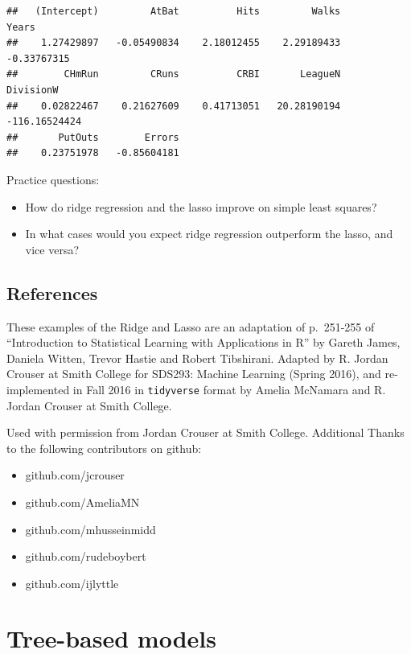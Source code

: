 \documentclass[openany]{book}
\providecommand{\tightlist}{%
  \setlength{\itemsep}{0pt}\setlength{\parskip}{0pt}}
\begin{document}
\begin{verbatim}
##   (Intercept)         AtBat          Hits         Walks         Years 
##    1.27429897   -0.05490834    2.18012455    2.29189433   -0.33767315 
##        CHmRun         CRuns          CRBI       LeagueN     DivisionW 
##    0.02822467    0.21627609    0.41713051   20.28190194 -116.16524424 
##       PutOuts        Errors 
##    0.23751978   -0.85604181
\end{verbatim}

Practice questions:

\begin{itemize}
\tightlist
\item
  How do ridge regression and the lasso improve on simple least squares?
\item
  In what cases would you expect ridge regression outperform the lasso, and vice versa?
\end{itemize}

\hypertarget{references}{%
\section{References}\label{references}}

These examples of the Ridge and Lasso are an adaptation of p.~251-255 of ``Introduction to
Statistical Learning with Applications in R'' by Gareth James, Daniela Witten, Trevor Hastie and Robert
Tibshirani. Adapted by R. Jordan Crouser at Smith College for SDS293: Machine Learning (Spring 2016), and re-implemented in Fall 2016 in \texttt{tidyverse} format by Amelia McNamara and R. Jordan Crouser at Smith College.

Used with permission from Jordan Crouser at Smith College. Additional Thanks to the following contributors on github:

\begin{itemize}
\tightlist
\item
  github.com/jcrouser
\item
  github.com/AmeliaMN
\item
  github.com/mhusseinmidd
\item
  github.com/rudeboybert
\item
  github.com/ijlyttle
\end{itemize}

\hypertarget{tree-based-models}{%
\chapter{Tree-based models}\label{tree-based-models}}
\end{document}
